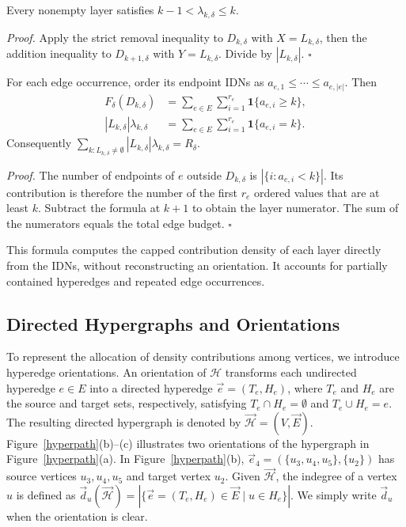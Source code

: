 \documentclass[twocolumn]{svjour3}
\begin{document}
\begin{lemma}\label{pd2}
Every nonempty layer satisfies $k-1<\lambda_{k,\delta}\le k$.
\end{lemma}
\emph{Proof.} Apply the strict removal inequality to $D_{k,\delta}$ with $X=L_{k,\delta}$, then the addition inequality to $D_{k+1,\delta}$ with $Y=L_{k,\delta}$. Divide by $|L_{k,\delta}|$. \hfill$\square$

\begin{proposition}\label{prop:layer-evaluation}
For each edge occurrence, order its endpoint IDNs as $a_{e,1}\le\cdots\le a_{e,|e|}$. Then
\begin{align*}
 F_\delta(D_{k,\delta})&=\sum_{e\in E}\sum_{i=1}^{r_e}\mathbf1\{a_{e,i}\ge k\},\\
 |L_{k,\delta}|\lambda_{k,\delta}&=\sum_{e\in E}\sum_{i=1}^{r_e}\mathbf1\{a_{e,i}=k\}.
\end{align*}
Consequently $\sum_{k:L_{k,\delta}\ne\emptyset}|L_{k,\delta}|\lambda_{k,\delta}=R_\delta$.
\end{proposition}
\emph{Proof.} The number of endpoints of $e$ outside $D_{k,\delta}$ is $|\{i:a_{e,i}<k\}|$. Its contribution is therefore the number of the first $r_e$ ordered values that are at least $k$. Subtract the formula at $k+1$ to obtain the layer numerator. The sum of the numerators equals the total edge budget. \hfill$\square$

This formula computes the capped contribution density of each layer directly from the IDNs, without reconstructing an orientation. It accounts for partially contained hyperedges and repeated edge occurrences.



\subsection{Directed Hypergraphs and Orientations}

To represent the allocation of density contributions among vertices, we introduce hyperedge orientations. An orientation of $\mathcal{H}$ transforms each undirected hyperedge $e\in E$ into a directed hyperedge $\vec e=(T_e,H_e)$, where $T_e$ and $H_e$ are the source and target sets, respectively, satisfying $T_e\cap H_e=\emptyset$ and $T_e\cup H_e=e$. The resulting directed hypergraph is denoted by $\vec{\mathcal{H}}=(V,\vec E)$.
Figure~\ref{hyperpath}(b)--(c) illustrates two orientations of the hypergraph in Figure~\ref{hyperpath}(a). In Figure~\ref{hyperpath}(b), $\vec e_4=(\{u_3,u_4,u_5\},\{u_2\})$ has source vertices $u_3,u_4,u_5$ and target vertex $u_2$. Given $\vec{\mathcal{H}}$, the indegree of a vertex $u$ is defined as
$\vec d_u(\vec{\mathcal{H}})=
\left|\{\vec e=(T_e,H_e)\in\vec E\mid u\in H_e\}\right|$.
We simply write $\vec d_u$ when the orientation is clear.
\end{document}
